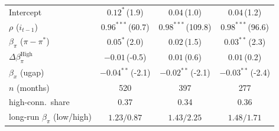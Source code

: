 \begin{tabular}{lccc}
Intercept & $0.12^{*}$\,{\scriptsize(1.9)} & $0.04$\,{\scriptsize(1.0)} & $0.04$\,{\scriptsize(1.2)} \\
$\rho$ ($i_{t-1}$) & $0.96^{***}$\,{\scriptsize(60.7)} & $0.98^{***}$\,{\scriptsize(109.8)} & $0.98^{***}$\,{\scriptsize(96.6)} \\
$\beta_\pi$ ($\pi-\pi^*$) & $0.05^{*}$\,{\scriptsize(2.0)} & $0.02$\,{\scriptsize(1.5)} & $0.03^{**}$\,{\scriptsize(2.3)} \\
$\Delta\beta_\pi^{\text{High}}$ & $-0.01$\,{\scriptsize(-0.5)} & $0.01$\,{\scriptsize(0.6)} & $0.01$\,{\scriptsize(0.2)} \\
$\beta_x$ (ugap) & $-0.04^{**}$\,{\scriptsize(-2.1)} & $-0.02^{**}$\,{\scriptsize(-2.1)} & $-0.03^{**}$\,{\scriptsize(-2.4)} \\
\addlinespace
$n$ (months) & 520 & 397 & 277 \\
high-conn.\ share & 0.37 & 0.34 & 0.36 \\
long-run $\beta_\pi$ (low/high) & $1.23/0.87$ & $1.43/2.25$ & $1.48/1.71$ \\
\bottomrule
\end{tabular}
